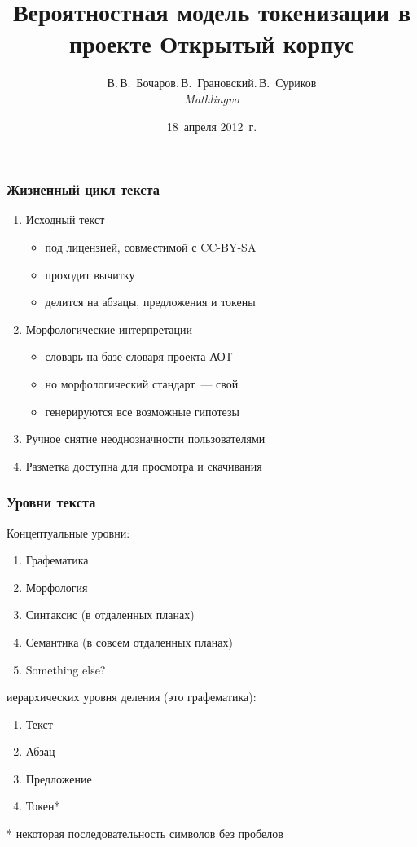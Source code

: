 \documentclass{beamer}
\title{Вероятностная модель токенизации в проекте Открытый корпус}
\author{В.\,В.~Бочаров\andД.\,В.~Грановский\andА.\,В.~Суриков\\\small\it Mathlingvo}
\date{18~апреля 2012~г.}
\begin{document}
\maketitle

\begin{frame}
\frametitle{Жизненный цикл текста}
\begin{enumerate}
\item{Исходный текст}
    \begin{itemize}
    \item{под лицензией, совместимой с CC-BY-SA}
    \item{проходит вычитку}
    \item{делится на абзацы, предложения и токены}
    \end{itemize}
\pause
\item{Морфологические интерпретации}
    \begin{itemize}
    \item{словарь на базе словаря проекта АОТ}
    \item{но морфологический стандарт~--- свой}
    \item{генерируются все возможные гипотезы}
    \end{itemize}
\pause
\item{Ручное снятие неоднозначности пользователями}
\pause
\item{Разметка доступна для просмотра и скачивания}
\end{enumerate}
\end{frame}

\begin{frame}
\frametitle{Уровни текста}
Концептуальные уровни:
\begin{enumerate}
\item{Графематика}
\item{Морфология}
\item{Синтаксис} (в отдаленных планах)
\item{Семантика} (в совсем отдаленных планах)
\item{Something else?}
\end{enumerate}
 иерархических уровня деления (это графематика):
\begin{enumerate}
\item{Текст}
\item{Абзац}
\item{Предложение}
\item{Токен*}
\end{enumerate}
* некоторая последовательность символов без пробелов
\end{frame}
\end{document}
